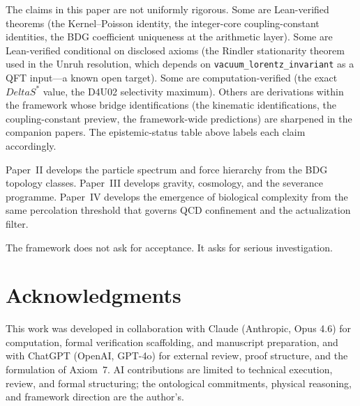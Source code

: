 \documentclass[11pt]{article}
\def\Delta{Delta}%
\begin{document}
The claims in this paper are not uniformly rigorous. Some are Lean-verified theorems (the Kernel--Poisson identity, the integer-core coupling-constant identities, the BDG coefficient uniqueness at the arithmetic layer). Some are Lean-verified conditional on disclosed axioms (the Rindler stationarity theorem used in the Unruh resolution, which depends on \texttt{vacuum\_lorentz\_invariant} as a QFT input---a known open target). Some are computation-verified (the exact $\Delta S^*$ value, the D4U02 selectivity maximum). Others are derivations within the framework whose bridge identifications (the kinematic identifications, the coupling-constant preview, the framework-wide predictions) are sharpened in the companion papers. The epistemic-status table above labels each claim accordingly.

Paper~II develops the particle spectrum and force hierarchy from the BDG topology classes. Paper~III develops gravity, cosmology, and the severance programme. Paper~IV develops the emergence of biological complexity from the same percolation threshold that governs QCD confinement and the actualization filter.

The framework does not ask for acceptance. It asks for serious investigation.

\section*{Acknowledgments}

This work was developed in collaboration with Claude (Anthropic, Opus 4.6) for computation, formal verification scaffolding, and manuscript preparation, and with ChatGPT (OpenAI, GPT-4o) for external review, proof structure, and the formulation of Axiom~7. AI contributions are limited to technical execution, review, and formal structuring; the ontological commitments, physical reasoning, and framework direction are the author's.
\end{document}
